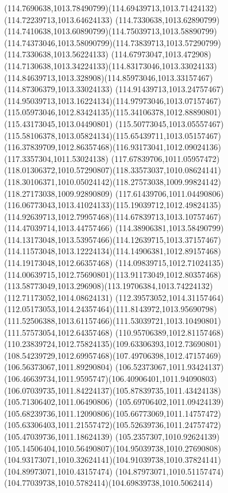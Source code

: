 {{	\curveto(114.7690638,1013.78490799)(114.69439713,1013.71424132)(114.72239713,1013.64624133)
	\curveto(114.7330638,1013.62890799)(114.7410638,1013.60890799)(114.75039713,1013.58890799)
	\curveto(114.74373046,1013.58090799)(114.73839713,1013.57290799)(114.7330638,1013.56224133)
	\curveto(114.67973047,1013.472908)(114.7130638,1013.34224133)(114.83173046,1013.33024133)
	\curveto(114.84639713,1013.328908)(114.85973046,1013.33157467)(114.87306379,1013.33024133)
	\curveto(114.91439713,1013.24757467)(114.95039713,1013.16224134)(114.97973046,1013.07157467)
	\curveto(115.05973046,1012.83424135)(115.34106378,1012.88890801)(115.43173045,1013.04490801)
	\curveto(115.50773045,1013.05557467)(115.58106378,1013.05824134)(115.65439711,1013.05157467)
	\curveto(116.37839709,1012.86357468)(116.93173041,1012.09024136)(117.3357304,1011.53024138)
	\curveto(117.67839706,1011.05957472)(118.01306372,1010.57290807)(118.33573037,1010.08624141)
	\curveto(118.30106371,1010.05024142)(118.27573038,1009.99824142)(118.27173038,1009.92890809)
	\curveto(117.61439706,1011.04490806)(116.06773043,1013.41024133)(115.19039712,1012.49824135)
	\curveto(114.92639713,1012.79957468)(114.67839713,1013.10757467)(114.47039714,1013.44757466)
	\curveto(114.38906381,1013.58490799)(114.13173048,1013.53957466)(114.12639715,1013.37157467)
	\curveto(114.11573048,1013.12224134)(114.14906381,1012.89157468)(114.19173048,1012.66357468)
	\curveto(114.09839715,1012.71024135)(114.00639715,1012.75690801)(113.91173049,1012.80357468)
	\curveto(113.58773049,1013.296908)(113.19706384,1013.74224132)(112.71173052,1014.08624131)
	\curveto(112.39573052,1014.31157464)(112.05173053,1014.24357464)(111.8143972,1013.95690798)
	\curveto(111.52506388,1013.61157466)(111.53039721,1013.10490801)(111.57573054,1012.64357468)
	\curveto(110.95706389,1012.81157468)(110.23839724,1012.75824135)(109.63306393,1012.73690801)
	\curveto(108.54239729,1012.69957468)(107.49706398,1012.47157469)(106.56373067,1011.89290804)
	\curveto(106.52373067,1011.93424137)(106.46639734,1011.9595747)(106.40906401,1011.94090803)
	\curveto(106.07039735,1011.84224137)(105.87839735,1011.43424138)(105.71306402,1011.06490806)
	\curveto(105.69706402,1011.09424139)(105.68239736,1011.12090806)(105.66773069,1011.14757472)
	\curveto(105.63306403,1011.21557472)(105.52639736,1011.24757472)(105.47039736,1011.18624139)
	\curveto(105.2357307,1010.92624139)(105.14506404,1010.56490807)(104.95039738,1010.27690808)
	\curveto(104.93173071,1010.32624141)(104.91039738,1010.37824141)(104.89973071,1010.43157474)
	\curveto(104.87973071,1010.51157474)(104.77039738,1010.5782414)(104.69839738,1010.5062414)
}}
